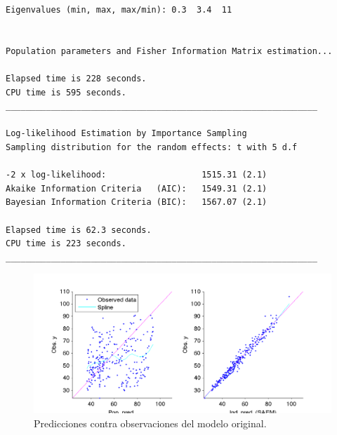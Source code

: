 \documentclass[letterpaper,12pt]{article}
\theoremstyle{definition} \newtheorem{Def}{Definición}[section]
\theoremstyle{definition} \newtheorem{Teo}{Teorema}[section]
\theoremstyle{definition} \newtheorem{Pro}{Proposición}
\theoremstyle{definition} \newtheorem{Lema}{Lema}[section]
\theoremstyle{definition} \newtheorem{Cor}{Corolario}[section]
\begin{document}
\begin{verbatim}
Eigenvalues (min, max, max/min): 0.3  3.4  11


Population parameters and Fisher Information Matrix estimation...

Elapsed time is 228 seconds. 
CPU time is 595 seconds. 
______________________________________________________________

Log-likelihood Estimation by Importance Sampling
Sampling distribution for the random effects: t with 5 d.f

-2 x log-likelihood:                   1515.31 (2.1)
Akaike Information Criteria   (AIC):   1549.31 (2.1)
Bayesian Information Criteria (BIC):   1567.07 (2.1)

Elapsed time is 62.3 seconds. 
CPU time is 223 seconds. 
______________________________________________________________
\end{verbatim}

\begin{figure}[h]
	\centering
	\includegraphics[angle=0,width=.8\textwidth]{predVsObs.png}
	\caption{\label{PvsO}Predicciones contra observaciones del modelo original.}
\end{figure}
\end{document}
